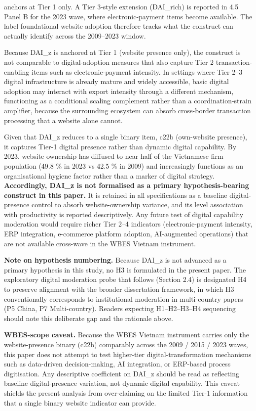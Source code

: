 \documentclass[12pt,a4paper]{article}
\begin{document}
anchors at Tier 1 only. A Tier 3-style extension (DAI\_rich) is reported
in 4.5 Panel B for the 2023 wave, where electronic-payment items become
available. The label foundational website adoption therefore tracks what
the construct can actually identify across the 2009--2023 window.

Because DAI\_z is anchored at Tier 1 (website presence only), the
construct is not comparable to digital-adoption measures that also
capture Tier 2 transaction-enabling items such as electronic-payment
intensity. In settings where Tier 2--3 digital infrastructure is already
mature and widely accessible, basic digital adoption may interact with
export intensity through a different mechanism, functioning as a
conditional scaling complement rather than a coordination-strain
amplifier, because the surrounding ecosystem can absorb cross-border
transaction processing that a website alone cannot.

Given that DAI\_z reduces to a single binary item, c22b (own-website
presence), it captures Tier-1 digital presence rather than dynamic
digital capability. By 2023, website ownership has diffused to near half
of the Vietnamese firm population (49.8 \% in 2023 vs 42.5 \% in 2009)
and increasingly functions as an organisational hygiene factor rather
than a marker of digital strategy. \textbf{Accordingly, DAI\_z is not
formalised as a primary hypothesis-bearing construct in this paper.} It
is retained in all specifications as a baseline digital-presence control
to absorb website-ownership variance, and its level association with
productivity is reported descriptively. Any future test of digital
capability moderation would require richer Tier 2--4 indicators
(electronic-payment intensity, ERP integration, e-commerce platform
adoption, AI-augmented operations) that are not available cross-wave in
the WBES Vietnam instrument.

\textbf{Note on hypothesis numbering.} Because DAI\_z is not advanced as
a primary hypothesis in this study, no H3 is formulated in the present
paper. The exploratory digital moderation probe that follows (Section
2.4) is designated H4 to preserve alignment with the broader
dissertation framework, in which H3 conventionally corresponds to
institutional moderation in multi-country papers (P5 China, P7
Multi-country). Readers expecting H1--H2--H3--H4 sequencing should note
this deliberate gap and the rationale above.

\textbf{WBES-scope caveat.} Because the WBES Vietnam instrument carries
only the website-presence binary (c22b) comparably across the 2009 /
2015 / 2023 waves, this paper does not attempt to test higher-tier
digital-transformation mechanisms such as data-driven decision-making,
AI integration, or ERP-based process digitisation. Any descriptive
coefficient on DAI\_z should be read as reflecting baseline
digital-presence variation, not dynamic digital capability. This caveat
shields the present analysis from over-claiming on the limited Tier-1
information that a single binary website indicator can provide.
\end{document}
